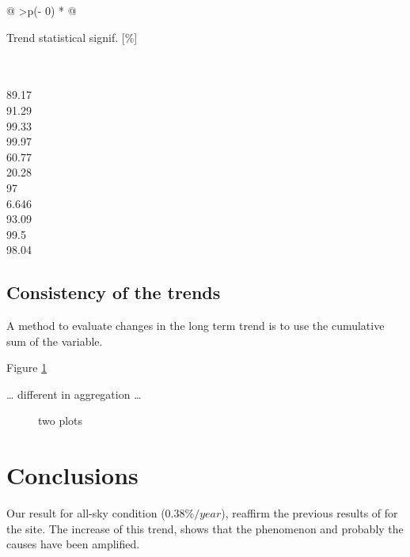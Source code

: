 \documentclass[preprint, 3p,
authoryear]{elsarticle} %
\begin{document}
\begin{longtable}[]{@{}
  >{\centering\arraybackslash}p{(\columnwidth - 0\tabcolsep) * }@{}}
\toprule\noalign{}
\begin{minipage}[b]{\linewidth}\centering
Trend statistical signif. {[}\%{]}
\end{minipage} \\
\midrule\noalign{}
\endhead
\bottomrule\noalign{}
 \\
89.17 \\
91.29 \\
99.33 \\
99.97 \\
60.77 \\
20.28 \\
97 \\
6.646 \\
93.09 \\
99.5 \\
98.04 \\
\end{longtable}

\hypertarget{consistency-of-the-trends}{%
\subsection{Consistency of the trends}\label{consistency-of-the-trends}}

A method to evaluate changes in the long term trend is to use the
cumulative sum of the variable.

Figure \ref{fig:cumsum}

\ldots{} different in aggregation \ldots{}

\begin{figure}[h!]

{\centering {}

}

\caption{two plots}\label{fig:cumsum}
\end{figure}

\hypertarget{conclusions}{%
\section{Conclusions}\label{conclusions}}

Our result for all-sky condition (\(0.38\%/year\)), reaffirm the
previous results of \citet{Bais2013} for the site. The increase of this
trend, shows that the phenomenon and probably the causes have been
amplified.
\end{document}
